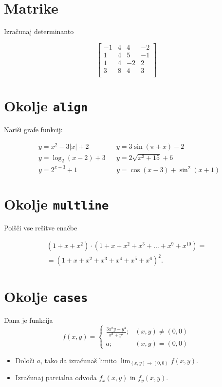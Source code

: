 \documentclass[a4paper,12pt]{article}
\begin{document}
\section*{Matrike}
Izračunaj determinanto
 
   \[
   \begin{bmatrix}
      -1 & 4 & 4 & -2 \\
      1 & 4 & 5 & -1 \\
      1 & 4 & -2 & 2 \\
      3 & 8 & 4 & 3 \\
   \end{bmatrix}
   \]

\section*{Okolje \texttt{align}}
Nariši grafe funkcij:

\begin{align*}   
 & y = x^2 - 3|x| + 2   & &y = 3 \sin(\pi+x) - 2\\
 & y = \log_2(x-2) + 3  & &y = 2 \sqrt{x^2+15} + 6\\
 & y = 2^{x-3} + 1      & &y = \cos(x-3) + \sin^2(x+1)
\end{align*}


\section*{Okolje \texttt{multline}}
Poišči vse rešitve enačbe


 
 \begin{multline*}
   (1+x+x^2) \cdot (1+x+x^2+x^3+\ldots+x^9+x^{10}) = \\
  =(1+x+x^2+x^3+x^4+x^5+x^6)^2.
 \end{multline*}


\section*{Okolje \texttt{cases}}
Dana je funkcija
   \[f(x,y)=\begin{cases}\frac{3x^2y-y^3}{x^2+y^2};&(x,y)\neq (0,0)\\
      a;&(x,y)=(0,0)
   \end{cases}\]
\begin{itemize}
\item Določi \(a\), tako da izračunaš limito \( \lim_{(x,y)\to(0,0)} f(x,y) \).
\item Izračunaj parcialna odvoda \(f_x(x,y)\) in \(f_y(x,y)\).
\end{itemize}
\end{document}
